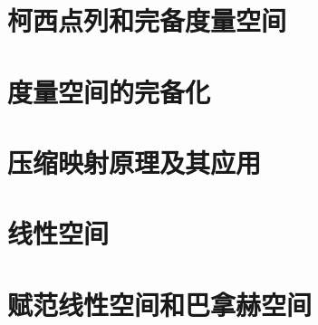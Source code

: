 \section{柯西点列和完备度量空间}\label{sec:1.4}



\section{度量空间的完备化}\label{sec:1.5}



\section{压缩映射原理及其应用}\label{sec:1.6}




\section{线性空间}\label{sec:1.7}



\section{赋范线性空间和巴拿赫空间}\label{sec:1.8}